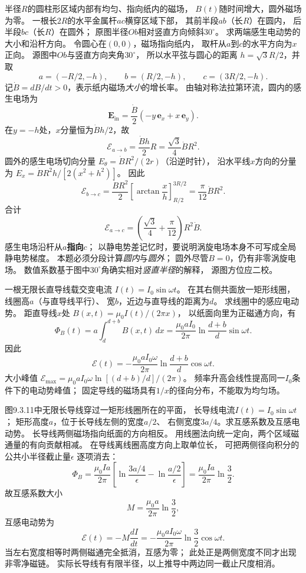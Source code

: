 \problemtext 半径$R$的圆柱形区域内部有均匀、指向纸内的磁场，
$B(t)$随时间增大，圆外磁场为零。
一根长$2R$的水平金属杆$ac$横穿区域下部，
其前半段$ab$（长$R$）在圆内，
后半段$bc$（长$R$）在圆外；
原图半径$Ob$相对竖直方向倾斜$30^\circ$。
求两端感生电动势的大小和沿杆方向。
\workings
令圆心在$(0,0)$，磁场指向纸内，
取杆从$a$到$c$的水平方向为$x$正向。
源图中$Ob$与竖直方向夹角$30^\circ$，
所以水平弦与圆心的距离
$h=\sqrt3R/2$，并取
\[
a=(-R/2,-h),\qquad b=(R/2,-h),\qquad c=(3R/2,-h).
\]
记$\dot B=dB/dt>0$，表示纸内磁场\emph{大小}的增长率。
由轴对称法拉第环流，圆内的感生电场为
\[
\bm E_{\mathrm{in}}
=\frac{\dot B}{2}(-y\,\bm e_x+x\,\bm e_y).
\]
在$y=-h$处，$x$分量恒为$\dot Bh/2$，故
\[
\mathcal E_{a\to b}
=\frac{\dot Bh}{2}R
=\frac{\sqrt3}{4}\dot BR^2.
\]
圆外的感生电场切向分量
$E_\theta=\dot BR^2/(2r)$（沿逆时针），
沿水平线$x$方向的分量为
$E_x=\dot BR^2h/[2(x^2+h^2)]$。
因此
\[
\mathcal E_{b\to c}
=\frac{\dot BR^2}{2}
\left[
\arctan\frac{x}{h}
\right]_{R/2}^{3R/2}
=\frac{\pi}{12}\dot BR^2.
\]
合计
\[
\boxed{\mathcal E_{a\to c}
=\left(\frac{\sqrt3}{4}+\frac{\pi}{12}\right)R^2\dot B}.
\]
感生电场沿杆从\textbf{$a$指向$c$}；
以静电势差记忆时，要说明涡旋电场本身不可写成全局静电势梯度。
\crosscheck 本题必须分段计算\emph{圆内}与\emph{圆外}；
圆外尽管$B=0$，仍有非零涡旋电场。
数值系数基于图中$30^\circ$角确实相对\emph{竖直半径}的解释，
源图方位应二校。

\problemtext 一根无限长直导线载交变电流
$I(t)=I_0\sin\omega t$。
在其右侧共面放一矩形线圈，线圈高$a$（与直导线平行）、
宽$b$，近边与直导线的距离为$d$。
求线圈中的感应电动势。
\workings
距直导线$x$处
$B(x,t)=\mu_0I(t)/(2\pi x)$，
以纸面向里为正磁通方向，有
\[
\Phi_B(t)=a\int_d^{d+b}B(x,t)\,dx
=\frac{\mu_0aI_0}{2\pi}
\ln\frac{d+b}{d}\sin\omega t.
\]
因此
\[
\boxed{\mathcal E(t)=
-\frac{\mu_0aI_0\omega}{2\pi}
\ln\frac{d+b}{d}\cos\omega t}.
\]
大小峰值
$\boxed{\mathcal E_{\max}
=\mu_0aI_0\omega\ln[(d+b)/d]/(2\pi)}$。
\crosscheck 频率升高会线性提高同一$I_0$条件下的电动势峰值；
固定导线的磁场具有$1/x$的径向分布，不能取为均匀场。

\problemtext 图9.3.11中无限长导线穿过一矩形线圈所在的平面，
长导线电流$I(t)=I_0\sin\omega t$；
矩形高度$a$，位于长导线左侧的宽度$a/2$、
右侧宽度$3a/4$。求互感系数及互感电动势。
\workings
长导线两侧磁场指向纸面的方向相反。
用线圈法向统一定向，两个区域磁通量的有向贡献相减。
在导线离线圈高度方向上取单位长，
可把两侧径向积分的公共小半径截止量$\epsilon$
逐项消去：
\[
\Phi_B=\frac{\mu_0Ia}{2\pi}
\left[
\ln\frac{3a/4}{\epsilon}
-\ln\frac{a/2}{\epsilon}
\right]
=\frac{\mu_0Ia}{2\pi}\ln\frac32.
\]
故互感系数大小
\[
\boxed{M=\frac{\mu_0a}{2\pi}\ln\frac32},
\]
互感电动势为
\[
\boxed{\mathcal E(t)=-M\frac{dI}{dt}
=-\frac{\mu_0aI_0\omega}{2\pi}
\ln\frac32\cos\omega t}.
\]
\crosscheck 当左右宽度相等时两侧磁通完全抵消，互感为零；
此处正是两侧宽度不同才出现非零净磁链。
实际长导线有有限半径，以上推导中两边同一截止尺度相消。

